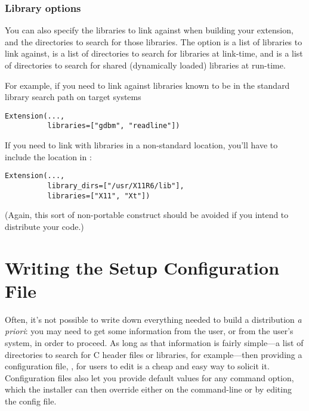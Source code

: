 \documentclass{howto}
\begin{document}
\subsubsection{Library options}

You can also specify the libraries to link against when building your
extension, and the directories to search for those libraries.  The
 option is a list of libraries to link against,
 is a list of directories to search for libraries at 
link-time, and  is a list of directories to 
search for shared (dynamically loaded) libraries at run-time.

For example, if you need to link against libraries known to be in the
standard library search path on target systems
\begin{verbatim}
Extension(...,
          libraries=["gdbm", "readline"])
\end{verbatim}

If you need to link with libraries in a non-standard location, you'll
have to include the location in :
\begin{verbatim}
Extension(...,
          library_dirs=["/usr/X11R6/lib"],
          libraries=["X11", "Xt"])
\end{verbatim}
(Again, this sort of non-portable construct should be avoided if you
intend to distribute your code.)



\section{Writing the Setup Configuration File}
\label{setup-config}

Often, it's not possible to write down everything needed to build a
distribution \emph{a priori}: you may need to get some information from
the user, or from the user's system, in order to proceed.  As long as
that information is fairly simple---a list of directories to search for
C header files or libraries, for example---then providing a
configuration file, , for users to edit is a cheap and
easy way to solicit it.  Configuration files also let you provide
default values for any command option, which the installer can then
override either on the command-line or by editing the config file.
\end{document}

